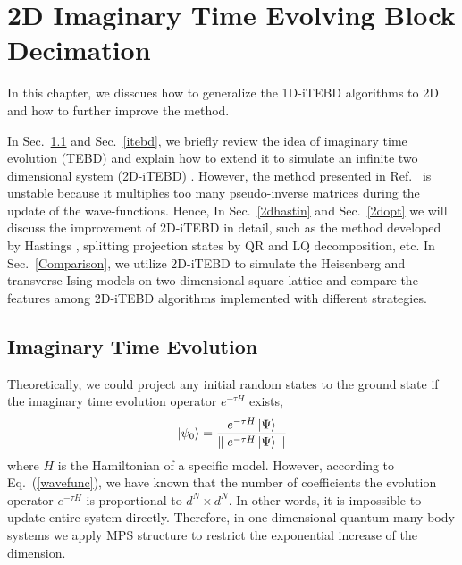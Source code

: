 \chapter{2D Imaginary Time Evolving Block Decimation}
\label{chapter:2ditebd}
In this chapter, we disscues how to generalize the 1D-iTEBD algorithms to 2D and how to further improve the method.

In Sec.~\ref{ite} and Sec.~\ref{itebd}, we briefly review the idea of imaginary time evolution (TEBD) \cite{PhysRevLett.93.040502} \cite{PhysRevB.78.155117} and explain how to extend it to simulate an infinite two dimensional system (2D-iTEBD) \cite{PhysRevB.86.195137}. However, the method presented in Ref.~\cite{PhysRevLett.101.090603} is unstable because it multiplies too many pseudo-inverse matrices during the update of the wave-functions. Hence, In Sec.~\ref{2dhastin} and Sec.~\ref{2dopt} we will discuss the improvement of 2D-iTEBD in detail, such as the method developed by Hastings \cite{light_hastings}, splitting projection states by QR and LQ decomposition, etc. In Sec.~\ref{Comparison}, we utilize 2D-iTEBD to simulate the Heisenberg and transverse Ising models on two dimensional square lattice and compare the features among 2D-iTEBD algorithms implemented with different strategies.


\section{Imaginary Time Evolution}
\label{ite}
Theoretically, we could project any initial random states to the ground state if the imaginary time evolution operator $e^{-\tau H}$ exists,  
\begin{align}
	\label{mapgroud}
	\Ket{\psi_0} = \frac{e^{-\tau H} \Ket{\Psi}}{\parallel e^{-\tau H} \Ket{\Psi}\parallel}
\end{align}
where $H$ is the Hamiltonian of a specific model. However, according to Eq.~(\ref{wavefunc}), we have known that the number of coefficients the evolution operator $e^{-\tau H}$ is proportional to $d^N \times d^N$. In other words, it is impossible to update entire system directly. Therefore, in one dimensional quantum many-body systems we apply MPS structure to restrict the exponential increase of the dimension. 

